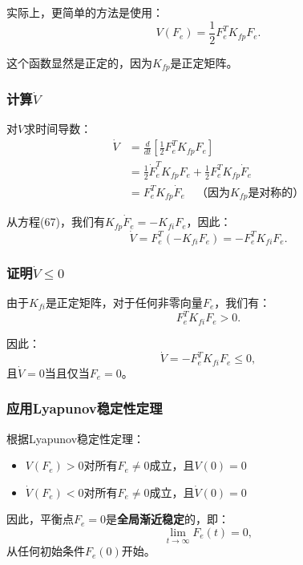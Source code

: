 \documentclass{article}
\begin{document}
实际上，更简单的方法是使用：
\begin{equation}
V(F_e) = \frac{1}{2}F_e^T K_{fp}F_e.
\end{equation}

这个函数显然是正定的，因为$K_{fp}$是正定矩阵。

\subsubsection{计算$\dot{V}$}

对$V$求时间导数：
\begin{align}
\dot{V} &= \frac{d}{dt}\left[\frac{1}{2}F_e^T K_{fp}F_e\right] \\
        &= \frac{1}{2}\dot{F}_e^T K_{fp}F_e + \frac{1}{2}F_e^T K_{fp}\dot{F}_e \\
        &= F_e^T K_{fp}\dot{F}_e \quad \text{（因为$K_{fp}$是对称的）}
\end{align}

从方程(67)，我们有$K_{fp}\dot{F}_e = -K_{fi}F_e$，因此：
\begin{equation}
\dot{V} = F_e^T(-K_{fi}F_e) = -F_e^T K_{fi}F_e.
\end{equation}

\subsubsection{证明$\dot{V} \leq 0$}

由于$K_{fi}$是正定矩阵，对于任何非零向量$F_e$，我们有：
\begin{equation}
F_e^T K_{fi}F_e > 0.
\end{equation}

因此：
\begin{equation}
\dot{V} = -F_e^T K_{fi}F_e \leq 0,
\end{equation}
且$\dot{V} = 0$当且仅当$F_e = 0$。

\subsubsection{应用Lyapunov稳定性定理}

根据Lyapunov稳定性定理：
\begin{itemize}
\item $V(F_e) > 0$对所有$F_e \neq 0$成立，且$V(0) = 0$
\item $\dot{V}(F_e) < 0$对所有$F_e \neq 0$成立，且$\dot{V}(0) = 0$
\end{itemize}

因此，平衡点$F_e = 0$是\textbf{全局渐近稳定}的，即：
\begin{equation}
\lim_{t \to \infty} F_e(t) = 0,
\end{equation}
从任何初始条件$F_e(0)$开始。
\end{document}
